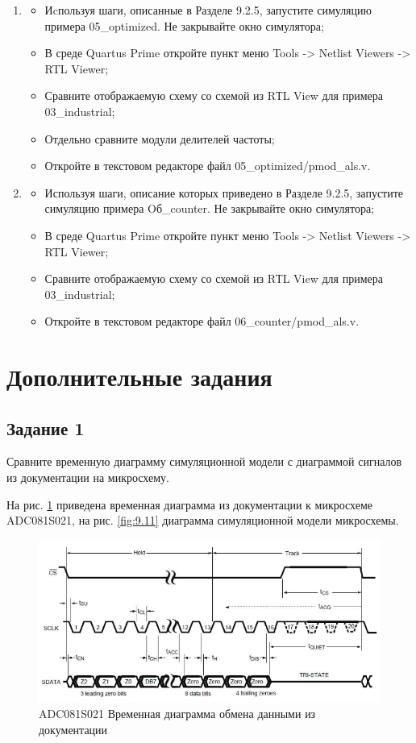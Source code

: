 \documentclass[a4paper,14pt]{article}
\begin{document}
\begin{enumerate}
		\item 
		\begin{itemize}
			\item Иcпользуя шаги, описанные в Разделе 9.2.5, запустите симуляцию примера 05\_optimized. Не закрывайте окно симулятора;
			\item В среде Quartus Prime откройте пункт меню Tools -> Netlist Viewers -> RTL Viewer;
			\item Сравните отображаемую схему со схемой из RТL View для примера 03\_industrial;
			\item Отдельно сравните модули делителей частоты;
			\item Откройте в текстовом редакторе файл 05\_optimized/pmod\_als.v.
		\end{itemize}
	
		\item 
		\begin{itemize}
			\item Используя шаги, описание которых приведено в Разделе 9.2.5, запустите симуляцию примера Oб\_counter. Не закрывайте окно симулятора;
			\item В среде Quartus Prime откройте пункт меню Tools -> Netlist Viewers -> RTL Viewer;
			\item Сравните отображаемую схему со схемой из RТL View для примера 03\_industrial;
			\item Откройте в текстовом редакторе файл 06\_counter/pmod\_als.v.
		\end{itemize}
	\end{enumerate}
	
	\section{Дополнительные задания}
	
	\subsection{Задание 1}
	
	Сравните временную диаграмму симуляционной модели с	диаграммой сигналов из документации на микросхему. 		
	
	На рис. \ref{fig:9.7} приведена временная диаграмма из документации к микросхеме ADC081S021, на рис. \ref{fig:9.11} диаграмма симуляционной модели микросхемы.
	
	\begin{figure}[H]
		\centering
		\includegraphics[width=0.9\linewidth]{images/9_7}
		\caption{ADC081S021 Временная диаграмма обмена данными из документации}
		\label{fig:9.7}
	\end{figure}
	
\end{document}

